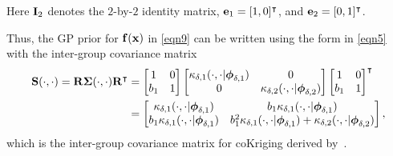 \documentclass[journal ]{new-aiaa}
\begin{document}
Here ${\bf I}_2$ denotes the $2$-by-$2$ identity matrix, ${\bf e}_1 = [1,0]^\intercal$, and ${\bf e}_2 = [0,1]^\intercal$. 

Thus, the GP prior for ${\bf f}({\bf x})$ in \cref{eqn9} can be written using the form in \cref{eqn5} with the inter-group covariance matrix
\begin{equation}\label{eqn11}
	\begin{aligned}
		{\bf S}(\cdot,\cdot)  = {\bf R} {\boldsymbol \Sigma}(\cdot,\cdot) {\bf R}^\intercal
		 &= \left[\begin{matrix}
		 	1 & 0 \\
		 	b_1 & 1
		 \end{matrix}\right] 
		 \left[\begin{matrix}
		 	\kappa_{\delta,1}(\cdot,\cdot|{\boldsymbol \phi}_{\delta,1}) & 0 \\
		 	0 & \kappa_{\delta,2}(\cdot,\cdot|{\boldsymbol \phi}_{\delta,2})
		 \end{matrix}\right]
		 \left[\begin{matrix}
		 	1 & 0 \\
		 	b_1 & 1
		 \end{matrix}\right]^\intercal \\
	 & = \left[\begin{matrix}
	 	\kappa_{\delta,1}(\cdot,\cdot|{\boldsymbol \phi}_{\delta,1}) & b_1 \kappa_{\delta,1}(\cdot,\cdot|{\boldsymbol \phi}_{\delta,1}) \\
	 	b_1 \kappa_{\delta,1}(\cdot,\cdot|{\boldsymbol \phi}_{\delta,1}) & b_1^2 \kappa_{\delta,1}(\cdot,\cdot|{\boldsymbol \phi}_{\delta,1})+\kappa_{\delta,2}(\cdot,\cdot|{\boldsymbol \phi}_{\delta,2})
	 \end{matrix}\right], 
	\end{aligned}
\end{equation}
which is the inter-group covariance matrix for coKriging derived by~\citet{Forrester2007}.
\end{document}
